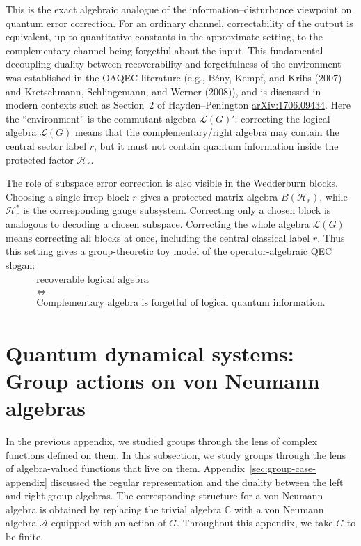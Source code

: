 \documentclass[11pt]{article}
\newcommand{\mA}{\mathcal{A}}
\newcommand{\mH}{\mathcal{H}}
\begin{document}
This is the exact algebraic analogue of the information--disturbance viewpoint
on quantum error correction. For an ordinary channel, correctability of the
output is equivalent, up to quantitative constants in the approximate setting,
to the complementary channel being forgetful about the input. This fundamental decoupling duality between recoverability and forgetfulness of the environment was established in the OAQEC literature (e.g., B\'eny, Kempf, and Kribs (2007) and Kretschmann, Schlingemann, and Werner (2008)), and is discussed in modern contexts such as Section~2 of Hayden--Penington
\href{https://arxiv.org/pdf/1706.09434}{arXiv:1706.09434}. Here the ``environment'' is the commutant algebra $\mathcal L(G)'$: correcting
the logical algebra $\mathcal L(G)$ means that the complementary/right algebra
may contain the central sector label $r$, but it must not contain quantum
information inside the protected factor $\mH_r$.

The role of subspace error correction is also visible in the Wedderburn blocks.
Choosing a single irrep block $r$ gives a protected matrix algebra
$B(\mH_r)$, while $\mH_r^*$ is the corresponding gauge subsystem. Correcting
only a chosen block is analogous to decoding a chosen subspace. Correcting the
whole algebra $\mathcal L(G)$ means correcting all blocks at once, including the
central classical label $r$. Thus this setting gives a
group-theoretic toy model of the operator-algebraic QEC slogan:
\begin{align}
    \begin{gathered}
    \text{recoverable logical algebra}\\
    \Longleftrightarrow\\
    \text{Complementary algebra is forgetful of logical quantum information}.
    \end{gathered}
\end{align}


\section{Quantum dynamical systems: Group actions on von Neumann algebras}
\label{sec:group-action-vna-duality}

In the previous appendix, we studied groups through the lens of complex functions defined on them. In this subsection, we study groups through the lens of algebra-valued functions that live on them. Appendix~\ref{sec:group-case-appendix} discussed the regular representation and
the duality between the left and right group algebras. The corresponding
structure for a von Neumann algebra is obtained by replacing the trivial algebra
$\mathbb C$ with a von Neumann algebra $\mA$ equipped with an action of $G$.
Throughout this appendix, we take $G$ to be finite.
\end{document}
